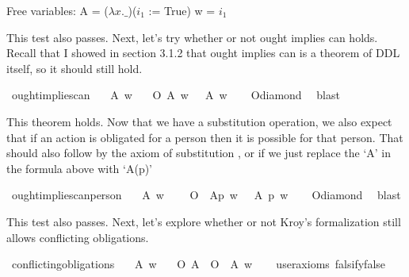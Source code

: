 \begin{isabellebody}
{  Free variables:
    A = ($\lambda x. \_$)($i_1$ := True)
    w = $i_1$%
}%
\endisatagproof
{\isafoldproof}%
%
\isadelimproof
%
\endisadelimproof
%
\begin{isamarkuptext}%
This test also passes. Next, let's try whether or not ought implies can holds. Recall that I 
        showed in section 3.1.2 that ought implies can is a theorem of DDL itself, so it should still hold.%
\end{isamarkuptext}\isamarkuptrue%
\isamarkupfalse%
\ ought{\isacharunderscore}implies{\isacharunderscore}can{\isacharcolon}\isanewline
\ \ \ A\ w\isanewline
\ \ \ {\isachardoublequoteopen}O\ {\isacharbraceleft}A{\isacharbraceright}\ w\ {\isasymlongrightarrow}\ {\isasymdiamond}\ A\ w{\isachardoublequoteclose}\isanewline
%
\isadelimproof
\ \ %
\endisadelimproof
%
\isatagproof
{}\isamarkupfalse%
\ O{\isacharunderscore}diamond\ \isamarkupfalse%
\ blast%
\endisatagproof
{\isafoldproof}%
%
\isadelimproof
%
\endisadelimproof
%
\begin{isamarkuptext}%
This theorem holds. Now that we have a substitution operation, we also expect that if an action 
      is obligated for a person then it is possible for that person. That should also follow by the 
      axiom of substitution \cite{cresswell}, or if we just replace the `A' in the formula above with 
      `A(p)'%
\end{isamarkuptext}\isamarkuptrue%
\isamarkupfalse%
\ ought{\isacharunderscore}implies{\isacharunderscore}can{\isacharunderscore}person{\isacharcolon}\isanewline
\ \ \ A\ w\ \isanewline
\ \ \ {\isachardoublequoteopen}O\ {\isacharbraceleft}\ A{\isacharparenleft}p{\isacharparenright}{\isacharbraceright}\ w\ {\isasymlongrightarrow}\ {\isasymdiamond}\ {\isacharparenleft}A\ {\isacharparenleft}p{\isacharparenright}{\isacharparenright}\ w{\isachardoublequoteclose}\isanewline
%
\isadelimproof
\ \ %
\endisadelimproof
%
\isatagproof
{}\isamarkupfalse%
\ O{\isacharunderscore}diamond\ \isamarkupfalse%
\ blast%
\endisatagproof
{\isafoldproof}%
%
\isadelimproof
%
\endisadelimproof
%
\begin{isamarkuptext}%
This test also passes. Next, let's explore whether or not Kroy's formalization still allows 
      conflicting obligations.%
\end{isamarkuptext}\isamarkuptrue%
\isamarkupfalse%
\ conflicting{\isacharunderscore}obligations{\isacharcolon}\isanewline
\ \ \ A\ w\isanewline
\ \ \ {\isachardoublequoteopen}{\isacharparenleft}O\ {\isacharbraceleft}A{\isacharbraceright}\ \isactrlbold {\isasymand}\ O\ {\isacharbraceleft}\isactrlbold {\isasymnot}\ A{\isacharbraceright}{\isacharparenright}\ w{\isachardoublequoteclose}\isanewline
\ \ \isamarkupfalse%
\ {\isacharbrackleft}user{\isacharunderscore}axioms{\isacharcomma}\ falsify{\isacharequal}false{\isacharbrackright}%
\isadelimproof
\ %
\endisadelimproof
%
\isatagproof
{}\isamarkupfalse%
\isanewline
%
\end{isabellebody}
